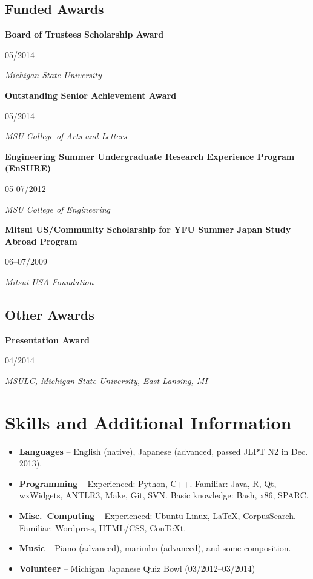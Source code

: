 \documentclass[10pt,oneside]{article}
\newcommand{\ressection}[1]{
	\vspace{-12pt}
	\section*{#1}
}
\newcommand{\ressubsection}[1]{
	\subsection*{#1}
	\vspace{-4pt}
}
\newcommand{\resitem}[2]{
	\item \parbox[t]{0.8\textwidth}{#1} \hfill #2
}
\newcommand{\resbigitem}[4]{
	\item \parbox[t]{0.8\textwidth}{\textbf{#1}} \hfill #2 \\
		\parbox[t]{0.8\textwidth}{\textit{#3}} \hfill \textit{#4}
}
\begin{document}
\ressubsection{Funded Awards}
\begin{reslist}
	\resbigitem{Board of Trustees Scholarship Award}
		{05/2014}
		{Michigan State University}
		{}
	\resbigitem{Outstanding Senior Achievement Award}
		{05/2014}
		{MSU College of Arts and Letters }
		{}
	\resbigitem{Engineering Summer Undergraduate Research Experience Program (EnSURE)}
		{05-07/2012}
		{MSU College of Engineering}
		{}
	\resbigitem{Mitsui US/Community Scholarship for YFU Summer Japan Study Abroad Program}
		{06--07/2009}
		{Mitsui USA Foundation}
		{}
\end{reslist}

\ressubsection{Other Awards}
\begin{reslist}
	\resbigitem{Presentation Award}
		{04/2014}
		{MSULC, Michigan State University, East Lansing, MI}
		{}
\end{reslist}



\ressection{Skills and Additional Information}

\begin{itemize}
	\item \textbf{Languages} -- English (native), Japanese (advanced, passed JLPT N2 in Dec. 2013).
	
	\item \textbf{Programming} -- Experienced: Python, C++. Familiar: Java, R, Qt, wxWidgets, ANTLR3, Make, Git, SVN. Basic knowledge: Bash, x86, SPARC.
	
	\item \textbf{Misc.\ Computing} -- Experienced: Ubuntu Linux, \LaTeX{}, CorpusSearch. Familiar: Wordpress, HTML/CSS, ConTeXt.
	
	\item \textbf{Music} --  Piano (advanced), marimba (advanced), and some composition.
	
	\item \textbf{Volunteer} -- Michigan Japanese Quiz Bowl (03/2012--03/2014)
\end{itemize}
\end{document}
